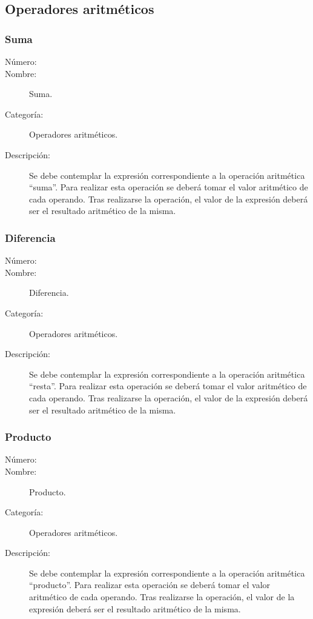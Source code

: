 \subsection{Operadores aritméticos}

\subsubsection{Suma}
	\begin{description}
		\item [Número:] \cn
		\item [Nombre:] Suma.
		\item [Categoría:] Operadores aritméticos.
		\item [Descripción:] Se debe contemplar la expresión correspondiente a la operación aritmética ``suma''. Para realizar
		esta operación se deberá tomar el valor aritmético de cada operando. Tras realizarse la operación, el valor de la expresión
		deberá ser el resultado aritmético de la misma.
	\end {description}

\subsubsection{Diferencia}
	\begin{description}
		\item [Número:] \cn
		\item [Nombre:] Diferencia.
		\item [Categoría:] Operadores aritméticos.
		\item [Descripción:] Se debe contemplar la expresión correspondiente a la operación aritmética ``resta''. Para realizar
		esta operación se deberá tomar el valor aritmético de cada operando. Tras realizarse la operación, el valor de la expresión
		deberá ser el resultado aritmético de la misma.
	\end {description}

\subsubsection{Producto}
	\begin{description}
		\item [Número:] \cn
		\item [Nombre:] Producto.
		\item [Categoría:] Operadores aritméticos.
		\item [Descripción:] Se debe contemplar la expresión correspondiente a la operación aritmética ``producto''. Para realizar
		esta operación se deberá tomar el valor aritmético de cada operando. Tras realizarse la operación, el valor de la expresión
		deberá ser el resultado aritmético de la misma.
	\end {description}


